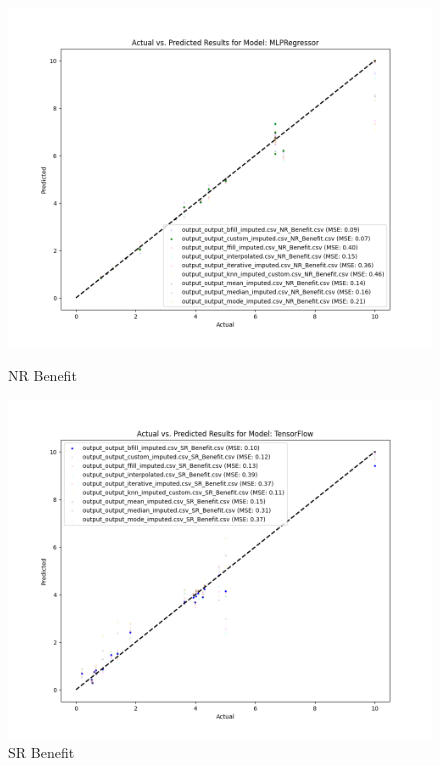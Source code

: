 \begin{figure}[H]
    \centering
    \begin{minipage}{0.495\textwidth}
        \centering
        \includegraphics[width=\linewidth]{reg_section_specific/images_reg_training/NR_Benefit_MLPRegressor_plot.png}
        \caption{NR Benefit}
        \label{fig_reg_spec:nr_ben_reg_training}
    \end{minipage}\hfill
    \begin{minipage}{0.495\textwidth}
        \centering
        \includegraphics[width=\linewidth]{reg_section_specific/images_reg_training/SR_Benefit_TensorFlow_plot.png}
        \caption{SR Benefit}
        \label{fig_reg_spec:sr_ben_reg_training}
    \end{minipage}
\end{figure}

